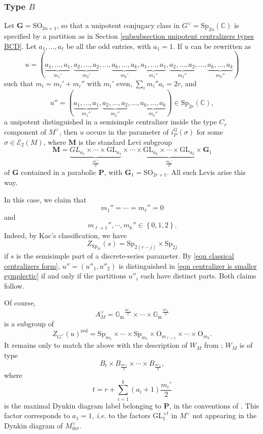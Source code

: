 \documentclass[10pt]{article}
\newcommand{\sett}[1]{\left\{#1\right\}}
\newcommand{\C}{\mathbb{C}}
\newcommand{\G}{\mathbf{G}}
\newcommand{\M}{\mathbf{M}}
\newcommand{\GL}{\mathrm{GL}}
\newcommand{\SO}{\mathrm{SO}}
\newcommand{\Sp}{\mathrm{Sp}}
\newcommand{\OO}{\mathrm{O}}
\newcommand{\Gm}{{\mathbb{G}_\mathrm{m}}}
\theoremstyle{definition}
\theoremstyle{remark}
\newcommand{\Zur}{Z_{G^\vee}(u)^{\mathrm{red}}}
\begin{document}
\subsubsection{Type $B$}
%
Let $\G=\SO_{2n+1}$, so that a unipotent conjugacy class in $G^\vee=\Sp_{2n}(\C)$ is
specified by a partition as in Section \ref{subsubsection unipotent centralizers types BCD}. Let $a_1,\dots, a_\ell$ be all the odd entries, with $a_1=1$. If $u$ can be rewritten as
%
\[
u=(\underbrace{a_1,\dots, a_1}_{m_1'}, \underbrace{a_2,\dots, a_2}_{m_2'},\dots,\underbrace{a_k,\dots, a_k}_{m_k'},\underbrace{a_1,\dots, a_1}_{m_1''}, \underbrace{a_2,\dots, a_2}_{m_2''},\dots,\underbrace{a_k,\dots, a_k}_{m_k''})
\]
%
such that $m_i=m_i'+m_i''$ with $m_i'$ even, $\sum_{i}m_i''a_i=2r$, and 
%
\[
u''=(\underbrace{a_1,\dots, a_1}_{m_1''}, \underbrace{a_2,\dots, a_2}_{m_2''},\dots,\underbrace{a_k,\dots, a_k}_{m_k''})\in\Sp_{2r}(\C),
\]
%
a unipotent distinguished in a semisimple centralizer inside the type $C_r$ component of $M^\vee$,
then $u$ occurs in the parameter of $i_P^G(\sigma)$ 
for some $\sigma\in\mathcal{E}_2(M)$, where $\M$ is the standard
Levi subgroup
%
\begin{equation}
\label{eqn type B standard Levi}
\M=\underbrace{GL_{a_1}\times\cdots\times\GL_{a_1}}_{\frac{m_1'}{2}}\times\cdots\times
\underbrace{\GL_{a_k}\times\cdots\times\GL_{a_k}}_{\frac{m_k'}{2}}\times\G_1
\end{equation}
%
of $\G$ contained in a parabolic $\mathbf{P}$, with $\G_1=\SO_{2r+1}$. All such Levis arise this way. 

In this case, we claim that 
%
\[
m_1''=\cdots = m_{\ell}''=0
\]
%
and
%
\[
m_{\ell+1}'',\cdots, m_{k}''\in\sett{0,1,2}.
\]
%
Indeed, by Kac's classification, we have 
%
\begin{equation}
\label{eqn centralizer is smaller symplectic}
Z_{\Sp_{2r}}(s)=\Sp_{2(r-j)}\times\Sp_{2j}
\end{equation}
%
if $s$ is the semisimple part of a discrete-series parameter. By 
\eqref{eqn classical centralizers form}, $u''=(u''_1,u''_2)$ is distinguished in \eqref{eqn 
centralizer is smaller symplectic} if and only if the partitions $u''_i$ each have distinct 
parts. Both claims follow.

Of course, 
%
\[
A_M^\vee=\Gm^{\frac{m'_1}{2}}\times\cdots\times
\Gm^{\frac{m'_k}{2}}
\]
%
is a subgroup of 
%
\[
\Zur=\Sp_{m_1}\times\cdots\times\Sp_{m_\ell}\times\OO_{m_{\ell+1}}\times
\cdots\times\OO_{m_k}.
\]
%
It remains only to match the above with the description of $W_M$
from \cite{Howlett}; $W_M$ is of type
%
\begin{equation}
\label{eqn type B Howlett match}
B_t\times B_{\frac{m'_2}{2}}\times\cdots\times B_{\frac{m'_k}{2}},
\end{equation}
%
where 
%
\[
t=r+\sum_{i=1}^{k}(a_i+1)\frac{m_i'}{2}
\]
%
is the maximal Dynkin diagram label belonging to $\mathbf{P}$, in the conventions of \cite{Howlett}. This factor corresponds to $a_1=1$, \textit{i.e.} to the factors $\GL_1^{\times t}$ in $M^\vee$ not appearing in the Dynkin diagram of $M^\vee_{\mathrm{der}}$.
\end{document}
